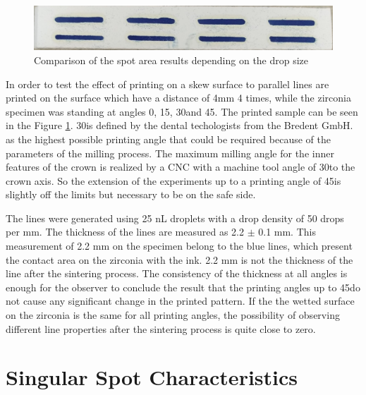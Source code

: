 	\bigskip

	\begin{figure}[H]
		\centering
		\includegraphics[width=1\textwidth]{grafiken/angleprint.jpg}
		\caption{Comparison of the spot area results depending on the drop size}
		\label{fig:angleprint}
	\end{figure} 

	\bigskip

In order to test the effect of printing on a skew surface to parallel lines are printed on the surface which have a distance of 4mm 4 times, while the zirconia specimen was standing at angles 0\textdegree \space, 15\textdegree \space, 30\textdegree \space and 45\textdegree \space. The printed sample can be seen in the Figure \ref{fig:angleprint}. 30\textdegree \space is defined by the dental techologists from the Bredent GmbH. as the highest possible printing angle that could be required because of the parameters of the milling process. The maximum milling angle for the inner features of the crown is realized by a CNC with a machine tool angle of 30\textdegree \space to the crown axis. So the extension of the experiments up to a printing angle of 45\textdegree \space is slightly off the limits but necessary to be on the safe side.

The lines were generated using 25 nL droplets with a drop density of 50 drops per mm. The thickness of the lines are measured as 2.2 $\pm$ 0.1 mm. This measurement of 2.2 mm on the specimen belong to the blue lines, which present the contact area on the zirconia with the ink. 2.2 mm is not the thickness of the line after the sintering process. The consistency of the thickness at all angles is enough for the observer to conclude the result that the printing angles up to 45\textdegree \space do not cause any significant change in the printed pattern. If the the wetted surface on the zirconia is the same for all printing angles, the possibility of observing different line properties after the sintering process is quite close to zero.

\section{Singular Spot Characteristics}

